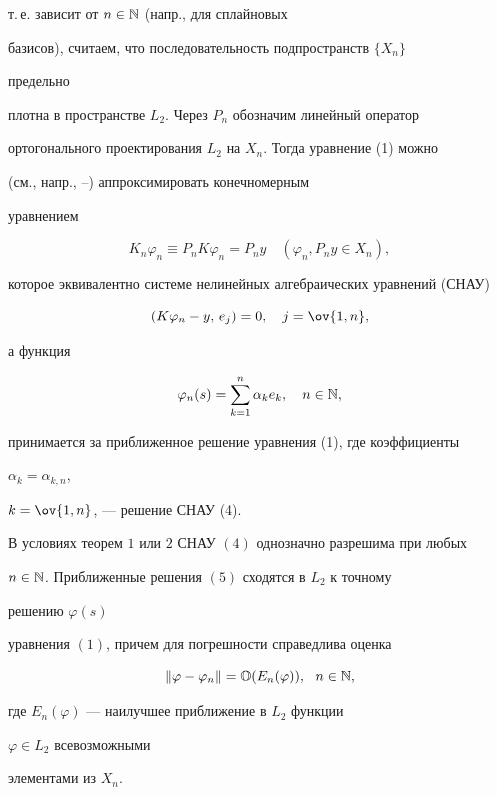 т.\,е. зависит от $n\in\Bbb N$ (напр., для сплайновых 


базисов), считаем, что последовательность подпространств $\{X_n\}$ 


предельно 


плотна в пространстве $L_2$. Через $P_n$ обозначим линейный оператор 


ортогонального проектирования $L_2$ на $X_n$. Тогда уравнение (1) можно 


(см., напр., \cite{11}--\cite{18}) аппроксимировать конечномерным 


уравнением


\begin{equation}


K_n\varphi_n\equiv P_n K\varphi_n=P_n y\quad


(\varphi_n, P_n y\in X_n),


\end{equation}


которое эквивалентно системе нелинейных алгебраических уравнений (СНАУ)


\begin{equation}


(K\varphi_n-y,\,e_j)=0,\quad j=\ov{1,n},


\end{equation}


а функция


\begin{equation}


\varphi_n(s)=\sum^n_{k=1}\alpha_k e_k,\quad n\in\Bbb N,


\end{equation}


принимается за приближенное решение уравнения (1), где коэффициенты 


$\alpha_k=\alpha_{k,n}$, 


$k=\ov{1,n}$, --- решение СНАУ (4).





\begin{thm}


В условиях теорем $1$ или $2$ СНАУ $(4)$ однозначно разрешима при любых 


$n\in \Bbb N$. Приближенные решения $(5)$ сходятся в $L_2$ к точному 


решению $\varphi(s)$ 


уравнения $(1)$, причем для погрешности справедлива оценка


$$


\|\varphi-\varphi_n\|=\Bbb O(E_n(\varphi)),\ \ n\in\Bbb N,


$$


где $E_n(\varphi)$ --- наилучшее приближение в $L_2$ функции 


$\varphi\in L_2$ всевозможными 


элементами из $X_n$.


\end{thm}





